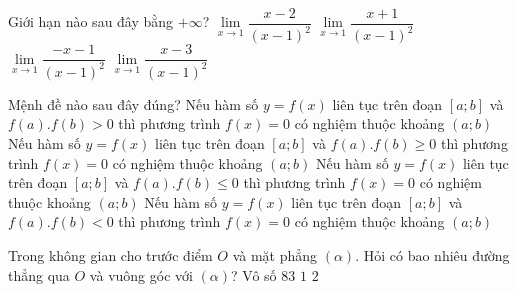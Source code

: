 \begin{ex}%
	Giới hạn nào sau đây bằng $+\infty$?
	\choice
	{$\lim\limits_{x\rightarrow 1} \dfrac{x-2}{(x-1)^2}$}
	{\True $\lim\limits_{x\rightarrow 1} \dfrac{x+1}{(x-1)^2}$}
	{$\lim\limits_{x\rightarrow 1} \dfrac{-x-1}{(x-1)^2}$}
	{$\lim\limits_{x\rightarrow 1} \dfrac{x-3}{(x-1)^2}$}
\end{ex}
\begin{ex}%
	Mệnh đề nào sau đây đúng?
	\choice
	{Nếu hàm số $y=f(x)$ liên tục trên đoạn $[a;b]$ và $f(a).f(b)>0$ thì phương trình $f(x)=0$ có nghiệm thuộc khoảng $(a;b)$}
	{Nếu hàm số $y=f(x)$ liên tục trên đoạn $[a;b]$ và $f(a).f(b) \ge 0$ thì phương trình $f(x)=0$ có nghiệm thuộc khoảng $(a;b)$}
	{Nếu hàm số $y=f(x)$ liên tục trên đoạn $[a;b]$ và $f(a).f(b) \le 0$ thì phương trình $f(x)=0$ có nghiệm thuộc khoảng $(a;b)$}
	{\True Nếu hàm số $y=f(x)$ liên tục trên đoạn $[a;b]$ và $f(a).f(b) < 0$ thì phương trình $f(x)=0$ có nghiệm thuộc khoảng $(a;b)$}
	\loigiai{
		
	}
\end{ex}
\begin{ex}%
	Trong không gian cho trước điểm $O$ và mặt phẳng $(\alpha)$. Hỏi có bao nhiêu đường thẳng qua $O$ và vuông góc với $(\alpha)$?
\choice
{Vô số}
{$83$}
{\True $1$}
{$2$}
\end{ex}

